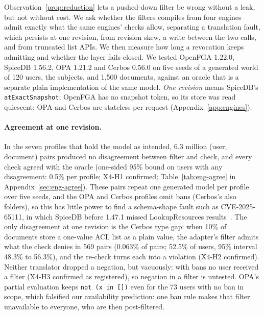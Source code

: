 
Observation~\ref{prop:reduction} lets a pushed-down filter be wrong without a leak, but not without
cost. We ask whether the filters \sys{} compiles from four engines admit exactly what the same engines'
checks allow, separating a translation fault, which persists at one revision, from revision skew, a write
between the two calls, and from truncated list APIs. We then measure how long a revocation keeps admitting
and whether the layer fails closed. We tested OpenFGA 1.22.0, SpiceDB 1.56.2, OPA 1.21.2 and Cerbos 0.56.0
on five seeds of a generated world of 120 users, the subjects, and 1,500 documents, against an oracle that is a separate plain
implementation of the same model. \emph{One
revision} means SpiceDB's \texttt{atExactSnapshot}; OpenFGA has no snapshot token, so its store was read quiescent;
OPA and Cerbos are stateless per request (Appendix~\ref{app:engines}).

\paragraph{Agreement at one revision.}
In the seven profiles that hold the model as intended, 6.3 million (user, document) pairs produced no
disagreement between filter and check, and every check agreed with the oracle (one-sided 95\% bound on
users with any disagreement: 0.5\% per profile; X4-H1 confirmed; Table~\ref{tab:eng-agree} in
Appendix~\ref{sec:eng-agree}). These pairs repeat one generated model per profile over five seeds, and the
OPA and Cerbos profiles omit bans (Cerbos's also folders), so this has little power to find a schema-shape fault such as
CVE-2025-65111, in which SpiceDB before 1.47.1 missed LookupResources results~\cite{nvd2025cve202565111}. The only disagreement at one revision is the Cerbos type gap: when 10\% of
documents store a one-value ACL list as a plain value, the adapter's filter admits what the check denies
in 569 pairs (0.063\% of pairs; 52.5\% of users, 95\% interval 48.3\% to 56.3\%), and the re-check turns
each into a violation (X4-H2 confirmed). Neither translator dropped a negation, but vacuously: with bans no user received a
filter (X4-H3 confirmed as registered), so negation in a filter is untested. OPA's
partial evaluation keeps \texttt{not (x in [])} even for the 73 users with no ban in scope, which falsified
our availability prediction: one ban rule makes that filter unavailable to everyone, who are then
post-filtered.

